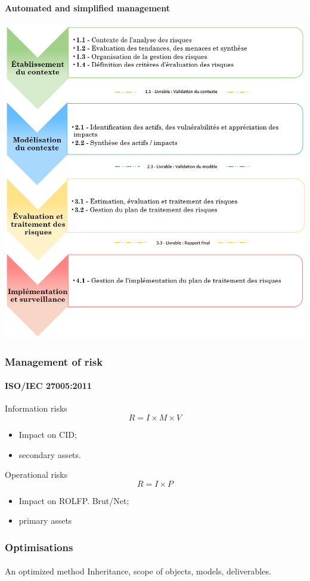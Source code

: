 \begin{frame}
    \frametitle{}
    \framesubtitle{Automated and simplified management}
    \begin{center}
        \includegraphics[scale=0.5]{./images/MONARC-method-2.png}
    \end{center}
\end{frame}


\begin{frame}
    \frametitle{Management of risk}
    \framesubtitle{ISO/IEC 27005:2011}
    \begin{block}{Information risks}
        $$R = I \times M \times V$$
        \begin{itemize}
            \item Impact on CID;
            \item secondary assets.
        \end{itemize}
    \end{block}


    \begin{block}{Operational risks}
        $$R = I \times P$$
        \begin{itemize}
            \item Impact on ROLFP. Brut/Net;
            \item primary assets
        \end{itemize}
    \end{block}
\end{frame}


\begin{frame}
    \frametitle{Optimisations}
    \framesubtitle{}
    \begin{block}{An optimized method}
        Inheritance, scope of objects, models, deliverables.
    \end{block}
\end{frame}
